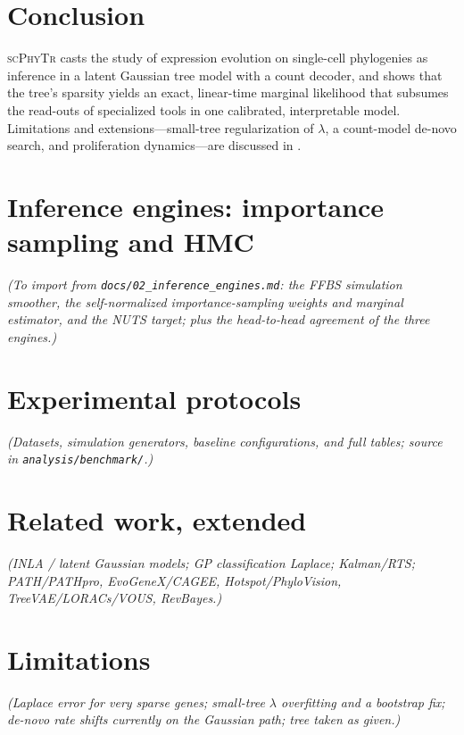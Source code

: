 \documentclass[11pt]{article}
\newcommand{\scphytr}{\textsc{scPhyTr}}
\begin{document}
\section{Conclusion}
\scphytr{} casts the study of expression evolution on single-cell phylogenies as inference in a
latent Gaussian tree model with a count decoder, and shows that the tree's sparsity yields an
exact, linear-time marginal likelihood that subsumes the read-outs of specialized tools in one
calibrated, interpretable model. Limitations and extensions---small-tree regularization of
$\lambda$, a count-model de-novo search, and proliferation dynamics---are discussed in
.

\appendix
\section{Inference engines: importance sampling and HMC}
\label{app:engines}
\emph{(To import from \texttt{docs/02\_inference\_engines.md}: the FFBS simulation smoother,
the self-normalized importance-sampling weights and marginal estimator, and the NUTS target;
plus the head-to-head agreement of the three engines.)}

\section{Experimental protocols}
\label{app:experiments}
\emph{(Datasets, simulation generators, baseline configurations, and full tables; source in
\texttt{analysis/benchmark/}.)}

\section{Related work, extended}
\label{app:related}
\emph{(INLA / latent Gaussian models; GP classification Laplace; Kalman/RTS; PATH/PATHpro,
EvoGeneX/CAGEE, Hotspot/PhyloVision, TreeVAE/LORACs/VOUS, RevBayes.)}

\section{Limitations}
\label{app:limitations}
\emph{(Laplace error for very sparse genes; small-tree $\lambda$ overfitting and a bootstrap
fix; de-novo rate shifts currently on the Gaussian path; tree taken as given.)}



\end{document}
